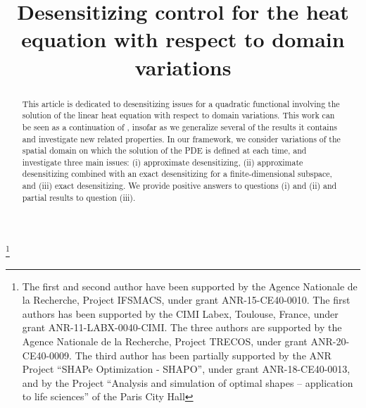\documentclass[JEP,XML,SOM,Unicode,NoFloatCountersInSection]{cedram}
\newcounter{question}
\theoremstyle{definition}
\begin{document}
\frontmatter
\title{Desensitizing control for the heat equation with respect to domain variations}

\author[\initial{S.} \lastname{Ervedoza}]{ }
\address{Institut de Mathématiques de Bordeaux, UMR 5251, Université de Bordeaux, CNRS, Bordeaux INP\\
F-33400 Talence, France}

\author[\initial{P.} \lastname{Lissy}]{ }
\address{Ceremade, Université Paris-Dauphine \& CNRS UMR 7534, Université PSL\\
75016 Paris, France}

\author[\initial{Y.} \lastname{Privat}]{ }
\address{Université de Strasbourg, CNRS UMR 7501, INRIA, Institut de Recherche Mathématique Avancée (IRMA)\\
7 rue René Descartes, 67084 Strasbourg, France\\
\& Institut Universitaire de France (IUF)}

\thanks{The first and second author have been supported by the Agence Nationale de la Recherche, Project IFSMACS, under grant ANR-15-CE40-0010. The first authors has been supported by the CIMI Labex, Toulouse, France, under grant ANR-11-LABX-0040-CIMI. The three authors are supported by the Agence Nationale de la Recherche, Project TRECOS, under grant ANR-20-CE40-0009. The third author has been partially supported by the ANR Project ``SHAPe Optimization - SHAPO'', under grant ANR-18-CE40-0013, and by the Project ``Analysis and simulation of optimal shapes -- application to life sciences'' of the Paris City Hall}

\begin{abstract}
This article is dedicated to desensitizing issues for a quadratic functional involving the solution of the linear heat equation with respect to domain variations. This work can be seen as a continuation of \cite{Lissy-Privat-Simpore}, insofar as we generalize several of the results it contains and investigate new related properties. In our framework, we consider variations of the spatial domain on which the solution of the PDE is defined at each time, and investigate three main issues: (i) approximate desensitizing, (ii) approximate desensitizing combined with an exact desensitizing for a finite-dimensional subspace, and (iii) exact desensitizing. We provide positive answers to questions (i) and (ii) and partial results to question (iii).
\end{abstract}
\end{document}

